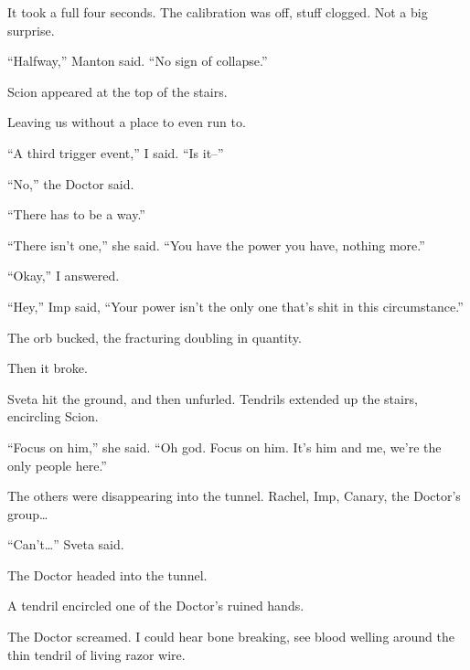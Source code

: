 It took a full four seconds.  The calibration was off, stuff clogged.  Not a big surprise.



``Halfway,'' Manton said.  ``No sign of collapse.''



Scion appeared at the top of the stairs.



Leaving us without a place to even run to.



``A third trigger event,'' I said.  ``Is it--''



``No,'' the Doctor said.



``There has to be a way.''



``There isn't one,'' she said.  ``You have the power you have, nothing more.''



``Okay,'' I answered.



``Hey,'' Imp said, ``Your power isn't the only one that's shit in this circumstance.''



The orb bucked, the fracturing doubling in quantity.



Then it broke.



Sveta hit the ground, and then unfurled.  Tendrils extended up the stairs, encircling Scion.



``Focus on him,'' she said.  ``Oh god.  Focus on him.  It's him and me, we're the only people here.''



The others were disappearing into the tunnel.  Rachel, Imp, Canary, the Doctor's group\ldots



``Can't\ldots'' Sveta said.



The Doctor headed into the tunnel.



A tendril encircled one of the Doctor's ruined hands.



The Doctor screamed.  I could hear bone breaking, see blood welling around the thin tendril of living razor wire.



